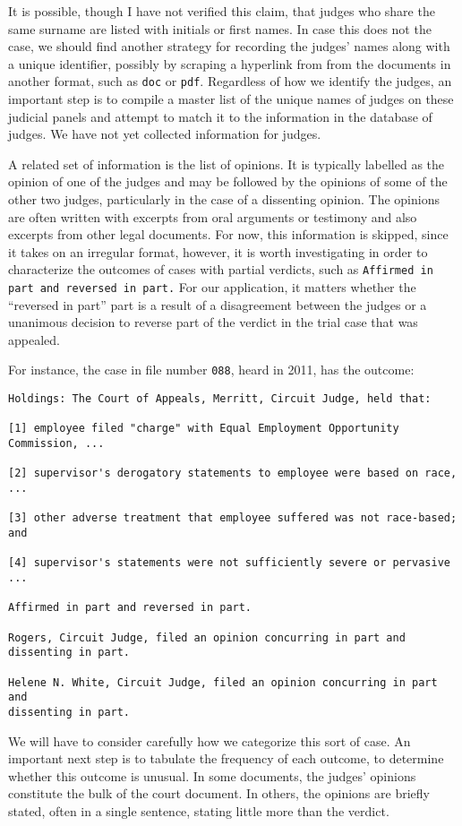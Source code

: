 \documentclass[11pt]{paper}
\begin{document}
It is possible, though I have not verified this claim, that judges who 
share the same surname are listed with initials or first names. 
In case this does not the case, we should find another strategy for recording 
the judges' names along with a unique identifier, 
possibly by scraping a hyperlink from from the documents in another format, 
such as \texttt{doc} or  \texttt{pdf}. 
Regardless of how we identify the judges, an important step is to compile a 
master list of the unique names of judges on these judicial panels and 
attempt to match it to the information in the database of judges. 
We have not yet collected information for judges. 

A related set of information is the list of opinions.  
It is typically labelled as the opinion of one of the judges and may be 
followed by the opinions of some of the other two judges, particularly in 
the case of a dissenting opinion. 
The opinions are often written with excerpts from oral arguments or testimony
and also excerpts from other legal documents. 
For now, this information is skipped, since it takes on an irregular format, 
however, it is worth investigating in order to characterize 
the outcomes of cases with partial verdicts, 
such as \texttt{Affirmed in part and reversed in part.}
For our application, it matters whether the ``reversed in part'' part is 
a result of a disagreement between the judges or a unanimous decision to 
reverse part of the verdict in the trial case that was appealed. 

For instance, the case in file number \texttt{088}, heard in 2011, 
has the outcome:
%
\begin{verbatim}
Holdings: The Court of Appeals, Merritt, Circuit Judge, held that:
 
[1] employee filed "charge" with Equal Employment Opportunity Commission, ...
 
[2] supervisor's derogatory statements to employee were based on race, ...
 
[3] other adverse treatment that employee suffered was not race-based; and
 
[4] supervisor's statements were not sufficiently severe or pervasive ...
 
Affirmed in part and reversed in part.
 
Rogers, Circuit Judge, filed an opinion concurring in part and dissenting in part.
 
Helene N. White, Circuit Judge, filed an opinion concurring in part and 
dissenting in part.
\end{verbatim}
%
We will have to consider carefully how we categorize this sort of case. 
An important next step is to tabulate the frequency of each outcome, to 
determine whether this outcome is unusual. 
In some documents, the judges' opinions constitute the bulk of the court 
document. 
In others, the opinions are briefly stated, often in a single sentence, 
stating little more than the verdict. 
\end{document}
